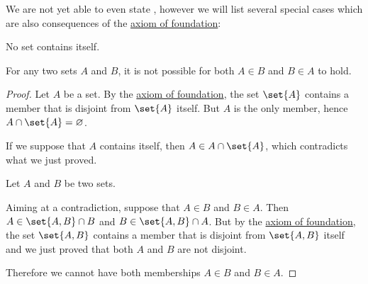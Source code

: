 \begin{proposition}\label{thm:simple_foundation_theorems}
  We are not yet able to even state , however we will list several special cases which are also consequences of the \hyperref[def:zfc/foundation]{axiom of foundation}:

  \begin{thmenum}
     No set contains itself.

     For any two sets \( A \) and \( B \), it is not possible for both \( A \in B \) and \( B \in A \) to hold.
  \end{thmenum}
\end{proposition}
\begin{proof}
   Let \( A \) be a set. By the \hyperref[def:zfc/foundation]{axiom of foundation}, the set \( \set{ A } \) contains a member that is disjoint from \( \set{ A } \) itself. But \( A \) is the only member, hence \( A \cap \set{ A } = \varnothing \).

  If we suppose that \( A \) contains itself, then \( A \in A \cap \set{ A } \), which contradicts what we just proved.

   Let \( A \) and \( B \) be two sets.

  Aiming at a contradiction, suppose that \( A \in B \) and \( B \in A \). Then \( A \in \set{ A, B } \cap B \) and \( B \in \set{ A, B } \cap A \). But by the \hyperref[def:zfc/foundation]{axiom of foundation}, the set \( \set{ A, B } \) contains a member that is disjoint from \( \set{ A, B } \) itself and we just proved that both \( A \) and \( B \) are not disjoint.

  Therefore we cannot have both memberships \( A \in B \) and \( B \in A \).
\end{proof}

